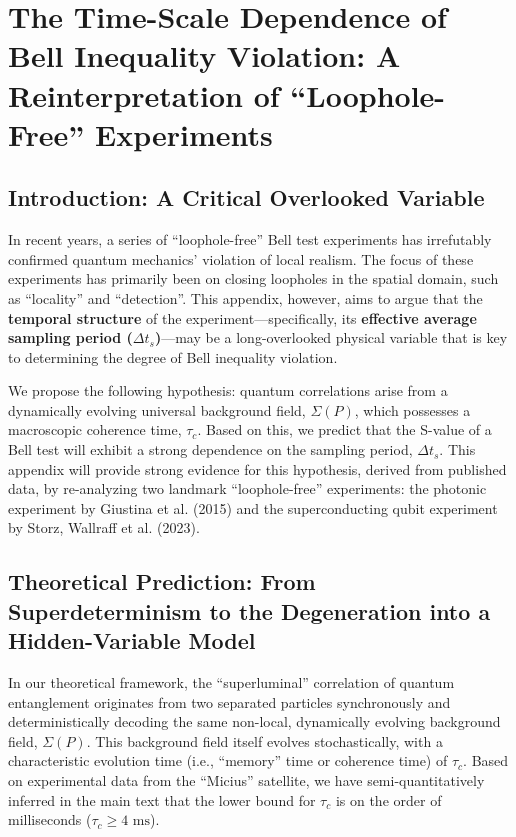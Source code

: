 \documentclass[11pt]{article}
\begin{document}
\newpage
\appendix
\renewcommand{\thesection}{\Alph{section}} %
\setcounter{section}{23} %

\section{The Time-Scale Dependence of Bell Inequality Violation: A Reinterpretation of ``Loophole-Free'' Experiments}

\subsection{Introduction: A Critical Overlooked Variable}

In recent years, a series of ``loophole-free'' Bell test experiments has irrefutably confirmed quantum mechanics' violation of local realism. The focus of these experiments has primarily been on closing loopholes in the spatial domain, such as ``locality'' and ``detection''. This appendix, however, aims to argue that the \textbf{temporal structure} of the experiment—specifically, its \textbf{effective average sampling period ($\Delta t_s$)}—may be a long-overlooked physical variable that is key to determining the degree of Bell inequality violation.

We propose the following hypothesis: quantum correlations arise from a dynamically evolving universal background field, $\Sigma(P)$, which possesses a macroscopic coherence time, $\tau_c$. Based on this, we predict that the S-value of a Bell test will exhibit a strong dependence on the sampling period, $\Delta t_s$. This appendix will provide strong evidence for this hypothesis, derived from published data, by re-analyzing two landmark ``loophole-free'' experiments: the photonic experiment by Giustina et al. (2015) and the superconducting qubit experiment by Storz, Wallraff et al. (2023).

\subsection{Theoretical Prediction: From Superdeterminism to the Degeneration into a Hidden-Variable Model}

In our theoretical framework, the ``superluminal'' correlation of quantum entanglement originates from two separated particles synchronously and deterministically decoding the same non-local, dynamically evolving background field, $\Sigma(P)$. This background field itself evolves stochastically, with a characteristic evolution time (i.e., ``memory'' time or coherence time) of $\tau_c$. Based on experimental data from the ``Micius'' satellite, we have semi-quantitatively inferred in the main text that the lower bound for $\tau_c$ is on the order of milliseconds ($\tau_c \geq 4 \text{ ms}$).
\end{document}
